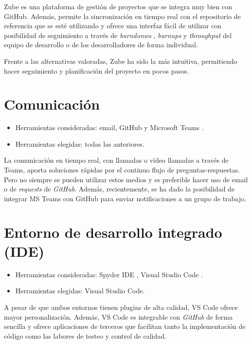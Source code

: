 Zube es una plataforma de gestión de proyectos que se integra muy bien con GitHub. Además,
permite la sincronización en tiempo real con el repositorio de referencia que se esté 
utilizando y ofrece una interfaz fácil de utilizar con posibilidad de seguimiento
a través de \emph{burndonws} , \emph{burnups} y \emph{throughput} del equipo de desarrollo 
o de los desarrolladores de forma individual. 

Frente a las alternativas valoradas, Zube ha sido la más intuitiva,
permitiendo hacer seguimiento y planificación del proyecto en pocos pasos. 


\section{Comunicación}\label{comunicacion}

\begin{itemize}
\tightlist
\item
  Herramientas consideradas: email, GitHub y Microsoft Teams \citep{online:ms_teams}.
\item
  Herramientas elegidas: todas las anteriores. 
\end{itemize}

La comunicación en tiempo real, con llamadas o vídeo llamadas a través de Teams, 
 aporta soluciones rápidas por el continuo flujo de preguntas-respuestas. Pero no 
 siempre se pueden utilizar estos medios y es preferible hacer uso de email 
 o de \emph{requests} de \emph{GitHub}. Además, recientemente, se ha dado la posibilidad
 de integrar MS Teams con GitHub \citep{online:integrar_teams_github} para enviar notificaciones 
 a un grupo de trabajo. 


\section{Entorno de desarrollo integrado (IDE)}\label{ide}

\begin{itemize}
\tightlist
\item
  Herramientas consideradas: Spyder IDE \citep{online:spyder}, Visual Studio Code \citep{online:vs_code}.
\item
  Herramientas elegidas: Visual Studio Code. 
\end{itemize}

A pesar de que ambos entornos tienen plugins de alta calidad, VS Code ofrece mayor 
personalización. Además, VS Code es integrable con \emph{GitHub} de forma sencilla y
ofrece aplicaciones de terceros que facilitan tanto la implementación de código como
las labores de testeo y control de calidad. 

